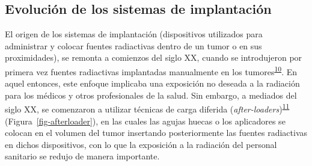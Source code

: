 \documentclass[
  a4paper,
]{scrreprt}
\begin{document}
\hypertarget{evoluciuxf3n-de-los-sistemas-de-implantaciuxf3n}{%
\subsection{Evolución de los sistemas de
implantación}\label{evoluciuxf3n-de-los-sistemas-de-implantaciuxf3n}}

El origen de los sistemas de implantación (dispositivos utilizados para
administrar y colocar fuentes radiactivas dentro de un tumor o en sus
proximidades), se remonta a comienzos del siglo XX, cuando se
introdujeron por primera vez fuentes radiactivas implantadas manualmente
en los tumores\textsuperscript{\protect\hyperlink{ref-introd2012}{10}}.
En aquel entonces, este enfoque implicaba una exposición no deseada a la
radiación para los médicos y otros profesionales de la salud. Sin
embargo, a mediados del siglo XX, se comenzaron a utilizar técnicas de
carga diferida
(\emph{after-loaders})\textsuperscript{\protect\hyperlink{ref-aronowitz2015}{11}}
(Figura~\ref{fig-afterloader}), en las cuales las agujas huecas o los
aplicadores se colocan en el volumen del tumor insertando posteriormente
las fuentes radiactivas en dichos dispositivos, con lo que la exposición
a la radiación del personal sanitario se redujo de manera importante.
\end{document}
